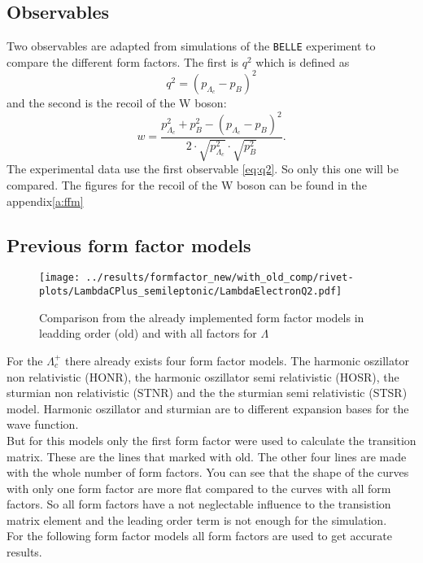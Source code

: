 \subsection{Observables}
Two observables are adapted from simulations of the \texttt{BELLE} experiment 
to compare the different form factors.
The first is \(q^2\) which is defined as
\begin{equation}
  q^2 = \left( p_{\Lambda_c} - p_B \right)^2 \label{eq:q2}
\end{equation}
and the second is the recoil of the W boson:
\begin{equation}
  w = \frac{p^2_{\Lambda_c} +  p^2_B - \left( p_{\Lambda_c} - p_B \right)^2}
  {2 \cdot \sqrt{p^2_{\Lambda_c}} \cdot \sqrt{p^2_B}}. \label{eq:w}
\end{equation}
The experimental data use the first observable {\eqref{eq:q2}}. So only this 
one will be compared. The figures for the recoil of the W boson can be found 
in the appendix{\ref{a:ffm}}

\subsection{Previous form factor models}
\begin{figure}[h]
  \centering
  \texttt{[image: ../results/formfactor\_new/with\_old\_comp/rivet-plots/LambdaCPlus\_semileptonic/LambdaElectronQ2.pdf]}
  \caption{Comparison from the already implemented form factor models in leadding order (old)
  and with all factors for \(\Lambda\)} \label{gr:with_old_comp}
\end{figure}

For the \(\Lambda_c^+\) there already exists four form factor models. The harmonic 
oszillator non relativistic (HONR), the harmonic oszillator semi relativistic 
(HOSR), the sturmian non relativistic (STNR) and the the sturmian semi 
relativistic (STSR) model. Harmonic oszillator and sturmian are to different 
expansion bases for the wave function. {\cite{prev}} \\
But for this models only the first form factor were used to calculate the 
transition matrix. These are the lines that marked with old. The other four 
lines are made with the whole number of form factors. You can see that the shape 
of the curves with only one form factor are more flat compared 
to the curves with all form factors. So all form factors have a not neglectable 
influence to the transistion matrix element and the leading order term is not 
enough for the simulation.\\ 
For the following form factor models all form factors are used to get accurate 
results.

